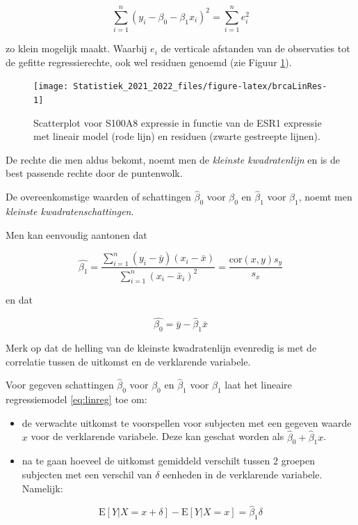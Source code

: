 \documentclass[
  12pt,dutch,coursenotes]{book}
\providecommand{\tightlist}{%
  \setlength{\itemsep}{0pt}\setlength{\parskip}{0pt}}
\theoremstyle{definition}
\theoremstyle{definition}
\theoremstyle{definition}
\theoremstyle{definition}
\theoremstyle{remark}
\begin{document}
\[\sum_{i=1}^n (y_i-\beta_0-\beta_1 x_i)^2=\sum_{i=1}^n e_i^2\]

zo klein mogelijk maakt. Waarbij \(e_i\) de verticale afstanden van de observaties tot de gefitte regressierechte, ook wel residuen genoemd (zie Figuur \ref{fig:brcaLinRes}).

\begin{figure}

{\centering \texttt{[image: Statistiek\_2021\_2022\_files/figure-latex/brcaLinRes-1]} 

}

\caption{Scatterplot voor S100A8 expressie in functie van de ESR1 expressie met lineair model (rode lijn) en residuen (zwarte gestreepte lijnen).}\label{fig:brcaLinRes}
\end{figure}

De rechte die men aldus bekomt, noemt men de
\emph{kleinste kwadratenlijn} en is de best passende rechte door de puntenwolk.

De overeenkomstige waarden of schattingen \(\hat{\beta}_0\) voor \(\beta_0\) en \(\hat{\beta}_1\) voor \(\beta_1\), noemt men \emph{kleinste kwadratenschattingen}.

Men kan eenvoudig aantonen dat

\[\hat{\beta_1}= \frac{\sum\limits_{i=1}^n (y_i-\bar y)(x_i-\bar x)}{\sum\limits_{i=1}^n (x_i-\bar x_i)^2}=\frac{\mbox{cor}(x,y)s_y}{s_x} \]

en dat

\[\hat{\beta_0}=\bar y - \hat{\beta}_1 \bar x \]

Merk op dat de helling van de kleinste kwadratenlijn evenredig is met de correlatie tussen de uitkomst en de verklarende variabele.

Voor gegeven schattingen \(\hat{\beta}_0\) voor \(\beta_0\) en \(\hat{\beta}_1\) voor \(\beta_1\) laat het lineaire regressiemodel \eqref{eq:linreg} toe om:

\begin{itemize}
\tightlist
\item
  de verwachte uitkomst te voorspellen voor subjecten met een gegeven
  waarde \(x\) voor de verklarende variabele. Deze kan geschat worden als \(\hat{\beta}_0+\hat{\beta}_1x\).
\item
  na te gaan hoeveel de uitkomst gemiddeld verschilt tussen 2 groepen subjecten met een verschil van \(\delta\) eenheden in de verklarende variabele. Namelijk:
\end{itemize}

\[\text{E}\left[Y|X=x+\delta\right]-\text{E}\left[Y|X=x\right]= \hat{\beta}_1\delta\]
\end{document}

